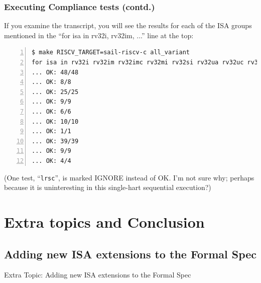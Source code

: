 \documentclass[aspectratio=169]{beamer}
\newcommand{\slidefont}{\scriptsize}
\begin{document}

\begin{frame}[fragile]
  \frametitle{Executing Compliance tests (contd.)}

  \slidefont

  If you examine the transcript, you will see the results for each of
  the ISA groups mentioned in the ``{for isa in rv32i, rv32im, ...}'' line at the top:

  \vspace{1ex}

  \begin{Verbatim}[frame=single, numbers=left, label = In your riscv-compliance repository clone]
$ make RISCV_TARGET=sail-riscv-c all_variant
for isa in rv32i rv32im rv32imc rv32mi rv32si rv32ua rv32uc rv32ui rv64i rv64im; do \
... OK: 48/48
... OK: 8/8
... OK: 25/25
... OK: 9/9
... OK: 6/6
... OK: 10/10
... OK: 1/1
... OK: 39/39
... OK: 9/9
... OK: 4/4
  \end{Verbatim}

(One test, ``{\tt lrsc}'', is marked IGNORE instead of OK. I'm not sure why;
perhaps because it is uninteresting in this single-hart sequential
execution?)

\end{frame}


\section{Extra topics and Conclusion}


\subsection{Adding new ISA extensions to the Formal Spec}


\begin{frame}[fragile]

  \slidefont

  \vfill

  \begin{center}\LARGE
    Extra Topic: Adding new ISA extensions to the Formal Spec
  \end{center}

  \vfill

\end{frame}
\end{document}
